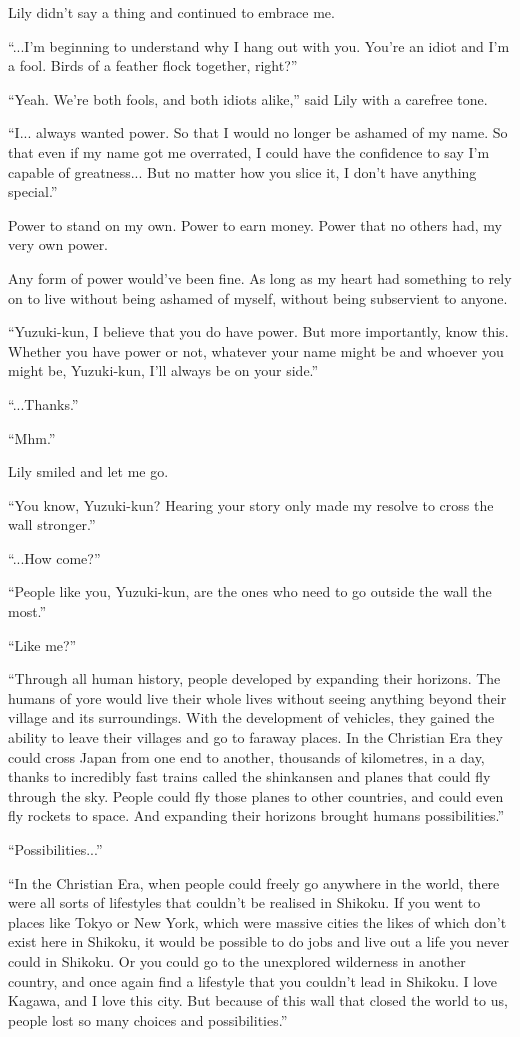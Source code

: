Lily didn't say a thing and continued to embrace me.

``...I'm beginning to understand why I hang out with you. You're an idiot and I'm a fool. Birds of a feather flock together, right?''

``Yeah. We're both fools, and both idiots alike,'' said Lily with a carefree tone.

``I... always wanted power. So that I would no longer be ashamed of my name. So that even if my name got me overrated, I could have the confidence to say I'm capable of greatness... But no matter how you slice it, I don't have anything special.''

Power to stand on my own. Power to earn money. Power that no others had, my very own power.

Any form of power would've been fine. As long as my heart had something to rely on to live without being ashamed of myself, without being subservient to anyone.

``Yuzuki-kun, I believe that you do have power. But more importantly, know this. Whether you have power or not, whatever your name might be and whoever you might be, Yuzuki-kun, I'll always be on your side.''

``...Thanks.''

``Mhm.''

Lily smiled and let me go.

``You know, Yuzuki-kun? Hearing your story only made my resolve to cross the wall stronger.''

``...How come?''

``People like you, Yuzuki-kun, are the ones who need to go outside the wall the most.''

``Like me?''

``Through all human history, people developed by expanding their horizons. The humans of yore would live their whole lives without seeing anything beyond their village and its surroundings. With the development of vehicles, they gained the ability to leave their villages and go to faraway places. In the Christian Era they could cross Japan from one end to another, thousands of kilometres, in a day, thanks to incredibly fast trains called the shinkansen and planes that could fly through the sky. People could fly those planes to other countries, and could even fly rockets to space. And expanding their horizons brought humans possibilities.''

``Possibilities...''

``In the Christian Era, when people could freely go anywhere in the world, there were all sorts of lifestyles that couldn't be realised in Shikoku. If you went to places like Tokyo or New York, which were massive cities the likes of which don't exist here in Shikoku, it would be possible to do jobs and live out a life you never could in Shikoku. Or you could go to the unexplored wilderness in another country, and once again find a lifestyle that you couldn't lead in Shikoku. I love Kagawa, and I love this city. But because of this wall that closed the world to us, people lost so many choices and possibilities.''

